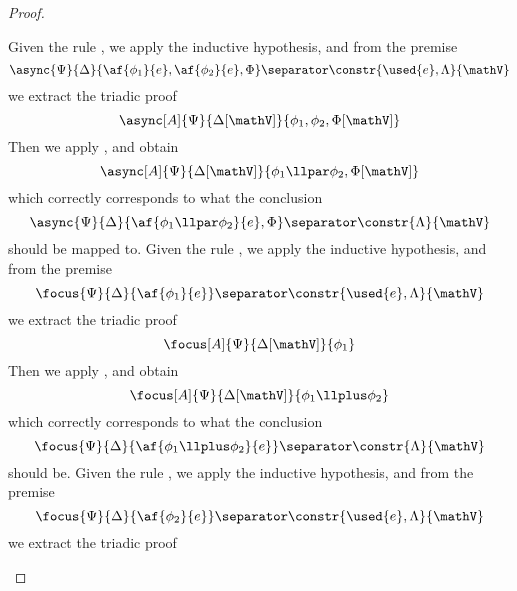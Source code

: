 \begin{proof}
\begin{itemize}
		\indCase{\displaypar} Given the rule \derRule{\displaypar}, we apply the inductive hypothesis, and from the premise
			$$ \async{\Psi}{\Delta}{\af{\phi_1}{e}, \af{\phi_2}{e}, \Phi} \separator \constr{\used{e}, \Lambda}{\mathV}$$
			we extract the triadic proof 
			$$\async[A]{\Psi}{\Delta[\mathV]}{\phi_1, \phi_2, \Phi[\mathV]} $$
			Then we apply \derRule[A]{\displaypar}, and obtain
			$$\async[A]{\Psi}{\Delta[\mathV]}{\phi_1 \llpar \phi_2, \Phi[\mathV]} $$
			which correctly corresponds to what the conclusion
			$$ \async{\Psi}{\Delta}{\af{\phi_1 \llpar \phi_2}{e}, \Phi} \separator \constr{\Lambda}{\mathV} $$
			should be mapped to.
		\indCase{\displayplus[L]} Given the rule \derRule{\displayplus[L]}, we apply the inductive hypothesis, and from the premise
			$$ \focus{\Psi}{\Delta}{\af{\phi_1}{e}} \separator \constr{\used{e}, \Lambda}{\mathV}$$
			we extract the triadic proof
			$$ \focus[A]{\Psi}{\Delta[\mathV]}{\phi_1} $$
			Then we apply \derRule[A]{\displayplus[L]}, and obtain
			$$ \focus[A]{\Psi}{\Delta[\mathV]}{\phi_1 \llplus \phi_2} $$
			which correctly corresponds to what the conclusion
			$$ \focus{\Psi}{\Delta}{\af{\phi_1 \llplus \phi_2}{e}} \separator \constr{\Lambda}{\mathV} $$
			should be.
		\indCase{\displayplus[R]} Given the rule \derRule{\displayplus[R]}, we apply the inductive hypothesis, and from the premise
			$$ \focus{\Psi}{\Delta}{\af{\phi_2}{e}} \separator \constr{\used{e}, \Lambda}{\mathV}$$
			we extract the triadic proof

\end{itemize}
\end{proof}
